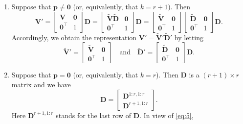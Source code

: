 \documentclass[11pt,a4paper]{article}
\theoremstyle{break}
\numberwithin{dummy}{section}
\theoremstyle{plain}
\theoremstyle{plain}
\theoremstyle{plain}
\theoremstyle{plain}
\theoremstyle{plain}
\theoremstyle{MyNonumberplain}
\newcommand{\0}{\M{0}}
\newcommand{\M}[1]{\mathbf{#1}}
\newcommand{\Mt}[1]{\tilde{\M{#1}}}
\newcommand{\T}{\top}
\newcommand{\ve}[1]{\mathbf{#1}}
\begin{document}
\begin{enumerate}[font=\upshape,label=(\roman*),wide,align=right]
\item Suppose that $\ve{p} \neq \0$ (or, equivalently, that $k= r + 1$).  Then
  \begin{displaymath}
    \M{V}' =
    \begin{bmatrix}
      \M{V} & \0
      \\
      \0^\T & 1
    \end{bmatrix}
    \M{D}
    =
    \begin{bmatrix}
      \Mt{V} \Mt{D} & \0
      \\
      \0^\T & 1
    \end{bmatrix}
    \M{D}
    =
    \begin{bmatrix}
      \Mt{V} & \0
      \\
      \0^\T & 1
    \end{bmatrix}
    \begin{bmatrix}
      \Mt{D} & \0
      \\
      \0^\T & 1
    \end{bmatrix}
    \M{D}.
  \end{displaymath}
  Accordingly, we obtain the representation
  \begin{math}
    \M{V}' = \Mt{V}' \Mt{D}'
  \end{math}
  by letting
  \begin{displaymath}
    \Mt{V}' =
    \begin{bmatrix}
      \Mt{V} & \0
      \\
      \0^\T & 1
    \end{bmatrix}
    \quad
    \text{and}
    \quad
    \Mt{D}' =
    \begin{bmatrix}
      \Mt{D} & \0
      \\
      \0^\T & 1
    \end{bmatrix}
    \M{D}.
  \end{displaymath}
\item Suppose that $\ve{p} = \0$ (or, equivalently, that $k = r$).  Then $\M{D}$
  is a $(r+1) \times r$ matrix and we have
  \begin{displaymath}
    \M{D}
    =
    \begin{bmatrix}
      \M{D}^{1:r,1:r}
      \\
      \M{D}^{r+1,1:r}
    \end{bmatrix}.
  \end{displaymath}
  Here $\M{D}^{r+1,1:r}$ stands for the last row of $\M{D}$.  In view of \eqref{eq:5},

\end{enumerate}
\end{document}
